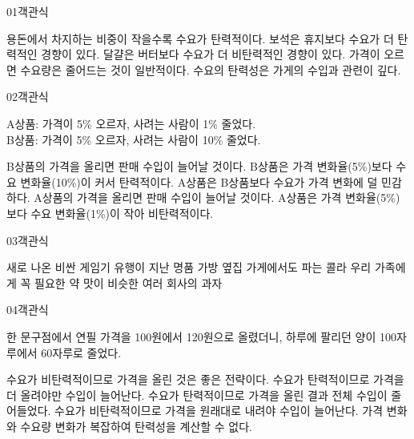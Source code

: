 \documentclass[fs9,seriesFre]{korfarm-base}
\begin{document}
\par\medskip
\kfBeginMC
\begin{kfQBlock}{01}{객관식}
\begin{kfChoices}
\kfChoice 용돈에서 차지하는 비중이 작을수록 수요가 탄력적이다.
\kfChoice 보석은 휴지보다 수요가 더 탄력적인 경향이 있다.
\kfChoice 달걀은 버터보다 수요가 더 비탄력적인 경향이 있다.
\kfChoice 가격이 오르면 수요량은 줄어드는 것이 일반적이다.
\kfChoice 수요의 탄력성은 가게의 수입과 관련이 깊다.
\end{kfChoices}
\end{kfQBlock}
\begin{kfQBlock}{02}{객관식}
\begin{kfEvidence}A상품: 가격이 5\% 오르자, 사려는 사람이 1\% 줄었다. \\\relax
B상품: 가격이 5\% 오르자, 사려는 사람이 10\% 줄었다.\end{kfEvidence}
\begin{kfChoices}
\kfChoice B상품의 가격을 올리면 판매 수입이 늘어날 것이다.
\kfChoice B상품은 가격 변화율(5\%)보다 수요 변화율(10\%)이 커서 탄력적이다.
\kfChoice A상품은 B상품보다 수요가 가격 변화에 덜 민감하다.
\kfChoice A상품의 가격을 올리면 판매 수입이 늘어날 것이다.
\kfChoice A상품은 가격 변화율(5\%)보다 수요 변화율(1\%)이 작아 비탄력적이다.
\end{kfChoices}
\end{kfQBlock}
\begin{kfQBlock}{03}{객관식}
\begin{kfChoices}
\kfChoice 새로 나온 비싼 게임기
\kfChoice 유행이 지난 명품 가방
\kfChoice 옆집 가게에서도 파는 콜라
\kfChoice 우리 가족에게 꼭 필요한 약
\kfChoice 맛이 비슷한 여러 회사의 과자
\end{kfChoices}
\end{kfQBlock}
\begin{kfQBlock}{04}{객관식}
\begin{kfEvidence}한 문구점에서 연필 가격을 100원에서 120원으로 올렸더니, 하루에 팔리던 양이 100자루에서 60자루로 줄었다.\end{kfEvidence}
\begin{kfChoices}
\kfChoice 수요가 비탄력적이므로 가격을 올린 것은 좋은 전략이다.
\kfChoice 수요가 탄력적이므로 가격을 더 올려야만 수입이 늘어난다.
\kfChoice 수요가 탄력적이므로 가격을 올린 결과 전체 수입이 줄어들었다.
\kfChoice 수요가 비탄력적이므로 가격을 원래대로 내려야 수입이 늘어난다.
\kfChoice 가격 변화와 수요량 변화가 복잡하여 탄력성을 계산할 수 없다.
\end{kfChoices}
\end{kfQBlock}
\end{document}
